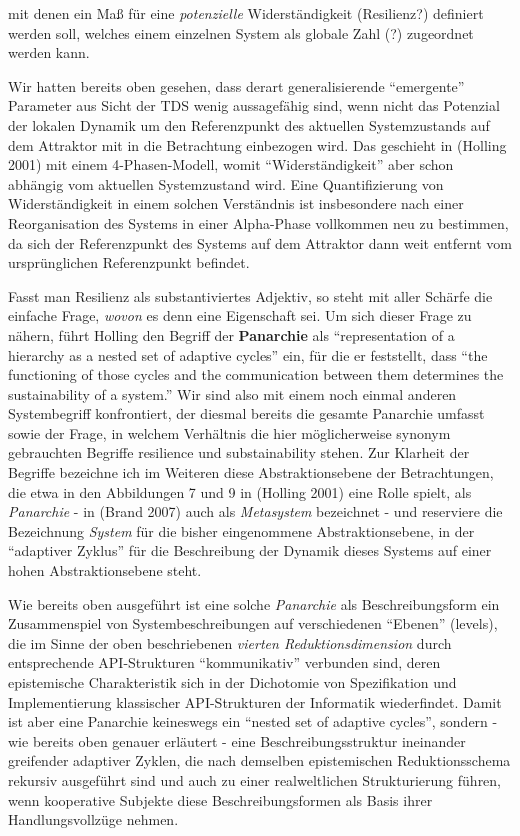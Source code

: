 \documentclass[11pt,a4paper]{article}
\begin{document}
mit denen ein Maß für eine \emph{potenzielle} Widerständigkeit
(Resilienz?) definiert werden soll, welches einem einzelnen System als
globale Zahl (?) zugeordnet werden kann.

Wir hatten bereits oben gesehen, dass derart generalisierende
``emergente'' Parameter aus Sicht der TDS wenig aussagefähig sind, wenn
nicht das Potenzial der lokalen Dynamik um den Referenzpunkt des
aktuellen Systemzustands auf dem Attraktor mit in die Betrachtung
einbezogen wird. Das geschieht in (Holling 2001) mit einem
4-Phasen-Modell, womit ``Widerständigkeit'' aber schon abhängig vom
aktuellen Systemzustand wird. Eine Quantifizierung von Widerständigkeit
in einem solchen Verständnis ist insbesondere nach einer Reorganisation
des Systems in einer Alpha-Phase vollkommen neu zu bestimmen, da sich
der Referenzpunkt des Systems auf dem Attraktor dann weit entfernt vom
ursprünglichen Referenzpunkt befindet.

Fasst man Resilienz als substantiviertes Adjektiv, so steht mit aller
Schärfe die einfache Frage, \emph{wovon} es denn eine Eigenschaft sei.
Um sich dieser Frage zu nähern, führt Holling den Begriff der
\textbf{Panarchie} als ``representation of a hierarchy as a nested set
of adaptive cycles'' ein, für die er feststellt, dass ``the functioning
of those cycles and the communication between them determines the
sustainability of a system.'' Wir sind also mit einem noch einmal
anderen Systembegriff konfrontiert, der diesmal bereits die gesamte
Panarchie umfasst sowie der Frage, in welchem Verhältnis die hier
möglicherweise synonym gebrauchten Begriffe resilience und
substainability stehen. Zur Klarheit der Begriffe bezeichne ich im
Weiteren diese Abstraktionsebene der Betrachtungen, die etwa in den
Abbildungen 7 und 9 in (Holling 2001) eine Rolle spielt, als
\emph{Panarchie} - in (Brand 2007) auch als \emph{Metasystem} bezeichnet
- und reserviere die Bezeichnung \emph{System} für die bisher
eingenommene Abstraktionsebene, in der ``adaptiver Zyklus'' für die
Beschreibung der Dynamik dieses Systems auf einer hohen
Abstraktionsebene steht.

Wie bereits oben ausgeführt ist eine solche \emph{Panarchie} als
Beschreibungsform ein Zusammenspiel von Systembeschreibungen auf
verschiedenen ``Ebenen'' (levels), die im Sinne der oben beschriebenen
\emph{vierten Reduktionsdimension} durch entsprechende API-Strukturen
``kommunikativ'' verbunden sind, deren epistemische Charakteristik sich
in der Dichotomie von Spezifikation und Implementierung klassischer
API-Strukturen der Informatik wiederfindet. Damit ist aber eine
Panarchie keineswegs ein ``nested set of adaptive cycles'', sondern -
wie bereits oben genauer erläutert - eine Beschreibungsstruktur
ineinander greifender adaptiver Zyklen, die nach demselben epistemischen
Reduktionsschema rekursiv ausgeführt sind und auch zu einer
realweltlichen Strukturierung führen, wenn kooperative Subjekte diese
Beschreibungsformen als Basis ihrer Handlungsvollzüge nehmen.
\end{document}
